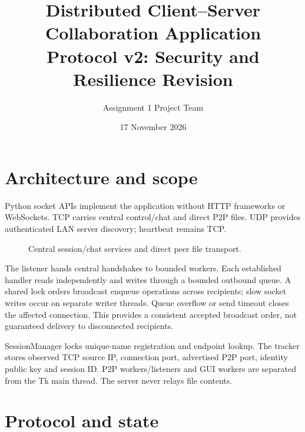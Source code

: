 \documentclass[11pt,a4paper]{article}
\title{Distributed Client--Server Collaboration Application\\Protocol v2: Security and Resilience Revision}
\author{Assignment 1 Project Team}
\date{17 November 2026}
\begin{document}
\maketitle
\tableofcontents
\clearpage


\section{Architecture and scope}

Python socket APIs implement the application without HTTP frameworks or WebSockets. TCP carries central control/chat and direct P2P files. UDP provides authenticated LAN server discovery; heartbeat remains TCP.


\begin{figure}[ht]
\centering
{}
\caption{Central session/chat services and direct peer file transport.}
\end{figure}


The listener hands central handshakes to bounded workers. Each established handler reads independently and writes through a bounded outbound queue. A shared lock orders broadcast enqueue operations across recipients; slow socket writes occur on separate writer threads. Queue overflow or send timeout closes the affected connection. This provides a consistent accepted broadcast order, not guaranteed delivery to disconnected recipients.

SessionManager locks unique-name registration and endpoint lookup. The tracker stores observed TCP source IP, connection port, advertised P2P port, identity public key and session ID. P2P workers/listeners and GUI workers are separated from the Tk main thread. The server never relays file contents.

\section{Protocol and state}
\end{document}

